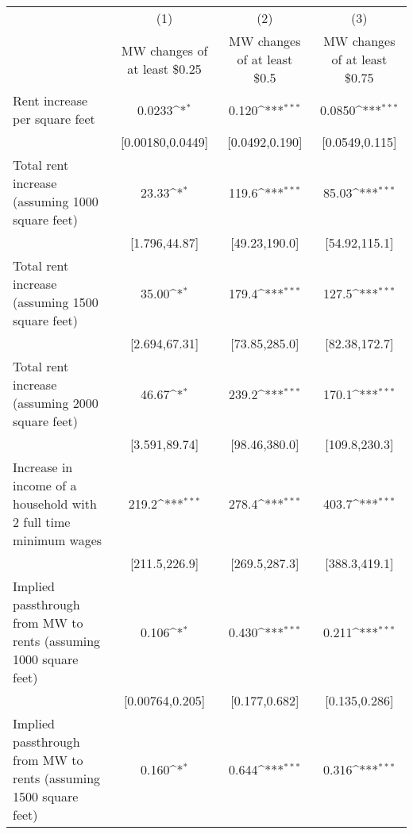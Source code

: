 {
\def\sym#1{\ifmmode^{#1}\else\(^{#1}\)\fi}
\begin{tabular}{l*{3}{c}}
\hline\hline
            &\multicolumn{1}{c}{(1)}        &\multicolumn{1}{c}{(2)}        &\multicolumn{1}{c}{(3)}        \\
            &\multicolumn{1}{c}{MW changes of at least \$0.25}&\multicolumn{1}{c}{MW changes of at least \$0.5}&\multicolumn{1}{c}{MW changes of at least \$0.75}\\
\hline
Rent increase per square feet&                0.0233\sym{*}  &                 0.120\sym{***}&                0.0850\sym{***}\\
            &      [0.00180,0.0449]         &        [0.0492,0.190]         &        [0.0549,0.115]         \\
[1em]
Total rent increase (assuming 1000 square feet)&                 23.33\sym{*}  &                 119.6\sym{***}&                 85.03\sym{***}\\
            &         [1.796,44.87]         &         [49.23,190.0]         &         [54.92,115.1]         \\
[1em]
Total rent increase (assuming 1500 square feet)&                 35.00\sym{*}  &                 179.4\sym{***}&                 127.5\sym{***}\\
            &         [2.694,67.31]         &         [73.85,285.0]         &         [82.38,172.7]         \\
[1em]
Total rent increase (assuming 2000 square feet)&                 46.67\sym{*}  &                 239.2\sym{***}&                 170.1\sym{***}\\
            &         [3.591,89.74]         &         [98.46,380.0]         &         [109.8,230.3]         \\
[1em]
Increase in income of a household with 2 full time minimum wages&                 219.2\sym{***}&                 278.4\sym{***}&                 403.7\sym{***}\\
            &         [211.5,226.9]         &         [269.5,287.3]         &         [388.3,419.1]         \\
[1em]
Implied passthrough from MW to rents (assuming 1000 square feet)&                 0.106\sym{*}  &                 0.430\sym{***}&                 0.211\sym{***}\\
            &       [0.00764,0.205]         &         [0.177,0.682]         &         [0.135,0.286]         \\
[1em]
Implied passthrough from MW to rents (assuming 1500 square feet)&                 0.160\sym{*}  &                 0.644\sym{***}&                 0.316\sym{***}\\

\end{tabular}}
